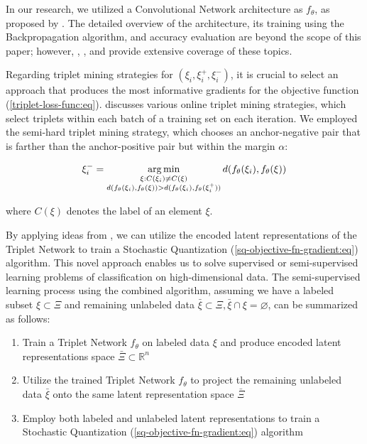 In our research, we utilized a Convolutional Network architecture as $f_{\theta}$, as proposed by \cite{Lecun_1998}. The detailed overview of the architecture, its training using the Backpropagation algorithm, and accuracy evaluation are beyond the scope of this paper; however, \cite{Beohar_2021}, \cite{Krizhevsky_2012}, and \cite{Lecun_1998} provide extensive coverage of these topics.

Regarding triplet mining strategies for $(\xi_i, \xi^+_i, \xi^-_i)$, it is crucial to select an approach that produces the most informative gradients for the objective function (\ref{triplet-loss-func:eq}). \cite{xuan2020} discusses various online triplet mining strategies, which select triplets within each batch of a training set on each iteration. We employed the semi-hard triplet mining strategy, which chooses an anchor-negative pair that is farther than the anchor-positive pair but within the margin $\alpha$:

\begin{equation}
    \label{semi-hard-triplet-mining:eq}
    \xi^-_i = \operatorname*{arg\,min}_{\substack{\xi: C(\xi_i) \neq C(\xi) \\ d(f_{\theta}(\xi_i), f_{\theta}(\xi)) > d(f_{\theta}(\xi_i), f_{\theta}(\xi^+_i))}} d(f_{\theta}(\xi_i), f_{\theta}(\xi))
\end{equation}

\noindent where $C(\xi)$ denotes the label of an element $\xi$.

By applying ideas from \cite{Hoffer_2015,MURASAKI_ANDO_SHIMAMURA_2022,Turpault_Serizel_Vincent_2019}, we can utilize the encoded latent representations of the Triplet Network to train a Stochastic Quantization (\ref{sq-objective-fn-gradient:eq}) algorithm. This novel approach enables us to solve supervised or semi-supervised learning problems of classification on high-dimensional data. The semi-supervised learning process using the combined algorithm, assuming we have a labeled subset $\xi \subset \Xi$ and remaining unlabeled data $\bar{\xi} \subset \Xi, \bar{\xi} \cap \xi = \varnothing$, can be summarized as follows:

\begin{enumerate}
    \item Train a Triplet Network $f_{\theta}$ on labeled data $\xi$ and produce encoded latent representations space $\bar{\Xi} \subset \mathbb{R}^n$
    \item Utilize the trained Triplet Network $f_{\theta}$ to project the remaining unlabeled data $\bar{\xi}$ onto the same latent representation space $\bar{\Xi}$
    \item Employ both labeled and unlabeled latent representations to train a Stochastic Quantization (\ref{sq-objective-fn-gradient:eq}) algorithm
\end{enumerate}